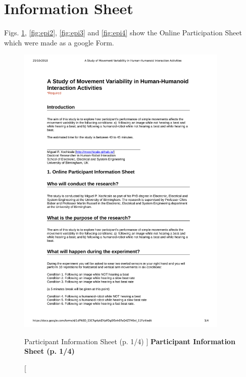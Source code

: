 \section{Information Sheet} \label{appendix:d:is}
Figs. \ref{fig:epi1}, \ref{fig:epi2}, \ref{fig:epi3} and \ref{fig:epi4}
show the Online Participation Sheet which were made as a google Form.

\begin{figure}
 \centering
   \includegraphics[width=0.9\textwidth]{epi1}
   \caption
	[Participant Information Sheet (p. 1/4) ]{
	{\bf Participant Information Sheet (p. 1/4)}
}
   \label{fig:epi1}
\end{figure}
